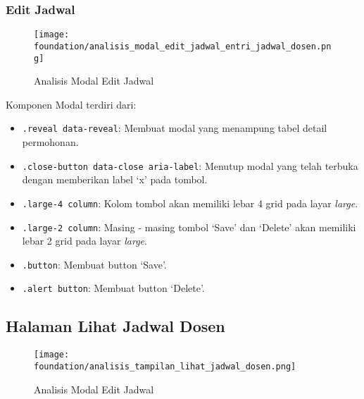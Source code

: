 \subsubsection{Edit Jadwal}
\begin{figure} [H]
\centering  
\texttt{[image: foundation/analisis\_modal\_edit\_jadwal\_entri\_jadwal\_dosen.png]}
\caption{Analisis Modal Edit Jadwal}
\end{figure}
Komponen Modal terdiri dari:
\begin{itemize}
	\item \texttt{.reveal data-reveal}: Membuat modal yang menampung tabel detail permohonan.
	\item \texttt{.close-button data-close aria-label}: Menutup modal yang telah terbuka dengan memberikan label `x' pada tombol.
	\item \texttt{.large-4 column}: Kolom tombol akan memiliki lebar 4 grid pada layar \textit{large}.
	\item \texttt{.large-2 column}: Masing - masing tombol `Save' dan `Delete' akan memiliki lebar 2 grid pada layar \textit{large}.
	\item \texttt{.button}: Membuat button `Save'.
	\item \texttt{.alert button}: Membuat button `Delete'.
\end{itemize}

\subsection{Halaman Lihat Jadwal Dosen}

\begin{figure} [H]
\centering  
\texttt{[image: foundation/analisis\_tampilan\_lihat\_jadwal\_dosen.png]}
\caption{Analisis Modal Edit Jadwal}
\end{figure}


